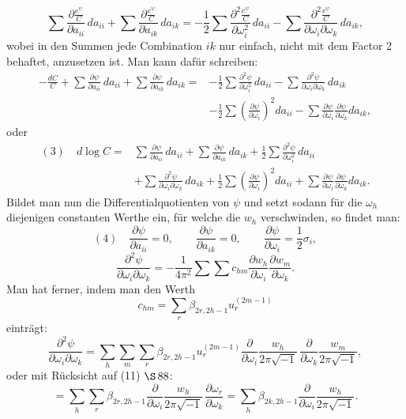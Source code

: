 \documentclass[10pt]{article}
\begin{document}
\[
\sum\frac{\partial\frac{e^\psi}{C}}{\partial a_{ii}}\,da_{ii}
+\sum\frac{\partial\frac{e^\psi}{C}}{\partial a_{ik}}\,da_{ik}
=
-\frac12\sum\frac{\partial^2\frac{e^\psi}{C}}{\partial\omega_i^2}\,da_{ii}
-\sum\frac{\partial^2\frac{e^\psi}{C}}{\partial\omega_i\partial\omega_k}\,da_{ik},
\]
wobei in den Summen jede Combination \(ik\) nur einfach, nicht mit dem Factor 2 behaftet, anzusetzen ist. Man kann dafür schreiben:
\[
\begin{aligned}
-\frac{dC}{C}
+\sum\frac{\partial\psi}{\partial a_{ii}}\,da_{ii}
+\sum\frac{\partial\psi}{\partial a_{ik}}\,da_{ik}
={}&-\frac12\sum\frac{\partial^2\psi}{\partial\omega_i^2}\,da_{ii}
-\sum\frac{\partial^2\psi}{\partial\omega_i\partial\omega_k}\,da_{ik}\\
&-\frac12\sum\left(\frac{\partial\psi}{\partial\omega_i}\right)^2da_{ii}
-\sum\frac{\partial\psi}{\partial\omega_i}\frac{\partial\psi}{\partial\omega_k}da_{ik},
\end{aligned}
\]
oder
\[
\begin{aligned}
(3)\quad d\log C={}&
\sum\frac{\partial\psi}{\partial a_{ii}}\,da_{ii}
+\sum\frac{\partial\psi}{\partial a_{ik}}\,da_{ik}
+\frac12\sum\frac{\partial^2\psi}{\partial\omega_i^2}\,da_{ii}\\
&+\sum\frac{\partial^2\psi}{\partial\omega_i\partial\omega_k}\,da_{ik}
+\frac12\sum\left(\frac{\partial\psi}{\partial\omega_i}\right)^2da_{ii}
+\sum\frac{\partial\psi}{\partial\omega_i}\frac{\partial\psi}{\partial\omega_k}da_{ik}.
\end{aligned}
\]
Bildet man nun die Differentialquotienten von \(\psi\) und setzt sodann für die \(\omega_h\) diejenigen constanten Werthe ein, für welche die \(w_h\) verschwinden, so findet man:
\[
(4)\quad
\frac{\partial\psi}{\partial a_{ii}}=0,\qquad
\frac{\partial\psi}{\partial a_{ik}}=0,\qquad
\frac{\partial\psi}{\partial\omega_i}=\frac12\sigma_i,
\]
\[
\frac{\partial^2\psi}{\partial\omega_i\partial\omega_k}
=
-\frac{1}{4\pi^2}\sum\sum c_{hm}
\frac{\partial w_h}{\partial\omega_i}
\frac{\partial w_m}{\partial\omega_k}.
\]
Man hat ferner, indem man den Werth
\[
c_{hm}=\sum_r\beta_{2r,2h-1}u_r^{(2m-1)}
\]
einträgt:
\[
\frac{\partial^2\psi}{\partial\omega_i\partial\omega_k}
=
\sum_h\sum_m\sum_r
\beta_{2r,2h-1}u_r^{(2m-1)}
\frac{\partial}{\partial\omega_i}\frac{w_h}{2\pi\sqrt{-1}}\,
\frac{\partial}{\partial\omega_k}\frac{w_m}{2\pi\sqrt{-1}},
\]
oder mit Rücksicht auf (11) \(\S\,88\):
\[
=
\sum_h\sum_r\beta_{2r,2h-1}
\frac{\partial}{\partial\omega_i}\frac{w_h}{2\pi\sqrt{-1}}\,
\frac{\partial\omega_r}{\partial\omega_k}
=
\sum_h\beta_{2k,2h-1}
\frac{\partial}{\partial\omega_i}\frac{w_h}{2\pi\sqrt{-1}}.
\]
\end{document}
